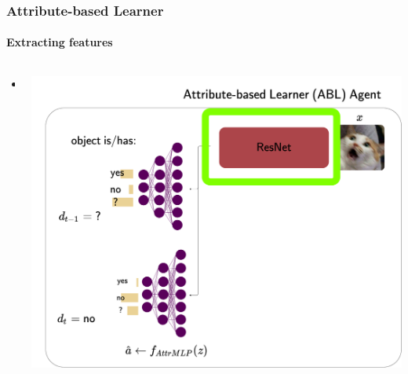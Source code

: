 \documentclass[9pt]{beamer}
\begin{document}
\begin{frame}
\frametitle{Attribute-based Learner}
\framesubtitle{Extracting features}
  \begin{columns}[T]
	\begin{column}{.5\textwidth}
		\begin{itemize}
			\item
		\end{itemize}
	\end{column}
	\begin{column}{.5\textwidth}
			\includegraphics[width=\textwidth]{images/urdtc_parts_resnet.pdf}
	\end{column}
\end{columns}
\end{frame}
\end{document}
